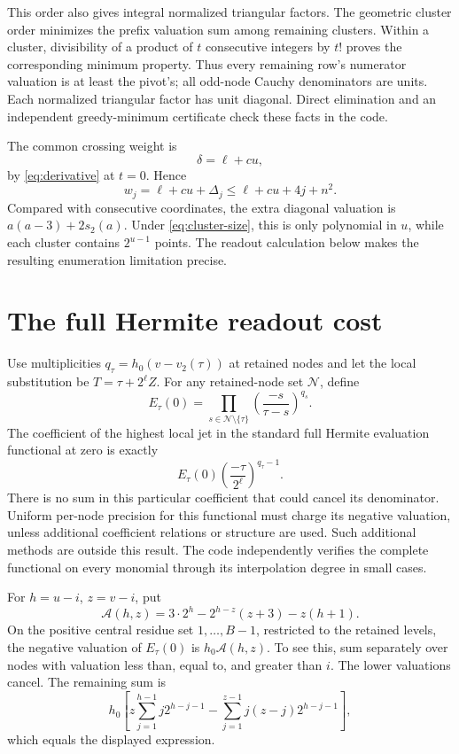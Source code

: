\documentclass[11pt]{article}
\begin{document}
This order also gives integral normalized triangular factors. The
geometric cluster order minimizes the prefix valuation sum among
remaining clusters. Within a cluster, divisibility of a product of
$t$ consecutive integers by $t!$ proves the corresponding minimum
property. Thus every remaining row's numerator valuation is at least
the pivot's; all odd-node Cauchy denominators are units. Each normalized
triangular factor has unit diagonal. Direct elimination and an
independent greedy-minimum certificate check these facts in the code.

The common crossing weight is
\[
 \delta=\ell+cu,
\]
by \eqref{eq:derivative} at $t=0$. Hence
\begin{equation}
 w_j=\ell+cu+\Delta_j
 \le\ell+cu+4j+n^2.
 \label{eq:weight-upper}
\end{equation}
Compared with consecutive coordinates, the extra diagonal valuation is
$a(a-3)+2s_2(a)$. Under \eqref{eq:cluster-size}, this is only polynomial
in $u$, while each cluster contains $2^{u-1}$ points. The readout
calculation below makes the resulting enumeration limitation precise.

\section{The full Hermite readout cost}
Use multiplicities $q_\tau=h_0(v-v_2(\tau))$ at retained nodes and
let the local substitution be $T=\tau+2^\ell Z$.
For any retained-node set $\mathcal N$, define
\[
 E_\tau(0)=\prod_{s\in\mathcal N\setminus\{\tau\}}
       \left(\frac{-s}{\tau-s}\right)^{q_s}.
\]
The coefficient of the highest local jet in the standard full Hermite
evaluation functional at zero is exactly
\begin{equation}
 E_\tau(0)\left(\frac{-\tau}{2^\ell}\right)^{q_\tau-1}.
 \label{eq:highest}
\end{equation}
There is no sum in this particular coefficient that could cancel its
denominator. Uniform per-node precision for this functional must charge
its negative valuation, unless additional coefficient relations or
structure are used. Such additional methods are outside this result.
The code independently verifies the complete functional on every
monomial through its interpolation degree in small cases.

For $h=u-i$, $z=v-i$, put
\[
 \mathcal A(h,z)=3\cdot2^h-2^{h-z}(z+3)-z(h+1).
\]
On the positive central residue set $1,\ldots,B-1$, restricted to the
retained levels, the negative valuation of $E_\tau(0)$ is
$h_0\mathcal A(h,z)$.
To see this, sum separately over nodes with valuation less than, equal
to, and greater than $i$. The lower valuations cancel. The remaining
sum is
\[
 h_0\left[z\sum_{j=1}^{h-1}j2^{h-j-1}
       -\sum_{j=1}^{z-1}j(z-j)2^{h-j-1}\right],
\]
which equals the displayed expression.
\end{document}
